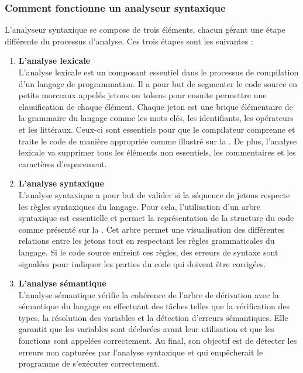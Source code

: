 \documentclass{rapport}
\begin{document}
\subsubsection{Comment fonctionne un analyseur syntaxique}
L'analyseur syntaxique se compose de trois éléments, chacun gérant une étape différente du processus d'analyse. Ces trois étapes sont les suivantes :
\begin{enumerate}
    \item \textbf{L'analyse lexicale}\\
    L'analyse lexicale est un composant essentiel dans le processus de compilation d'un langage de programmation. Il a pour but de segmenter le code source en petits morceaux appelés jetons ou tokens pour ensuite permettre une classification de chaque élément. Chaque jeton est une brique élémentaire de la grammaire du langage comme les mots clés, les identifiants, les opérateurs et les littéraux. Ceux-ci sont essentiels pour que le compilateur comprenne et traite le code de manière appropriée comme illustré sur la . De plus, l'analyse lexicale va supprimer tous les éléments non essentiels, les commentaires et les caractères d'espacement.
    \item \textbf{L'analyse syntaxique}\\
    L'analyse syntaxique a pour but de valider si la séquence de jetons respecte les règles syntaxiques du langage. Pour cela, l'utilisation d'un arbre syntaxique est essentielle et permet la représentation de la structure du code comme présenté sur la . Cet arbre permet une visualisation des différentes relations entre les jetons tout en respectant les règles grammaticales du langage. Si le code source enfreint ces règles, des erreurs de syntaxe sont signalées pour indiquer les parties du code qui doivent être corrigées.
    \item \textbf{L'analyse sémantique}\\
    L'analyse sémantique vérifie la cohérence de l'arbre de dérivation avec la sémantique du langage en effectuant des tâches telles que la vérification des types, la résolution des variables et la détection d'erreurs sémantiques. Elle garantit que les variables sont déclarées avant leur utilisation et que les fonctions sont appelées correctement. Au final, son objectif est de détecter les erreurs non capturées par l'analyse syntaxique et qui empêcherait le programme de s'exécuter correctement.
\end{enumerate}
\end{document}
